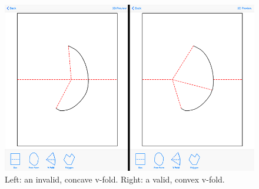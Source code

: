 \begin{figure}[htbp]
\centering
\includegraphics{figures/44_Tech_Validity/invalid_valid_vfold.png}
\caption{Left: an invalid, concave v-fold. Right: a valid, convex
v-fold.}
\end{figure}
